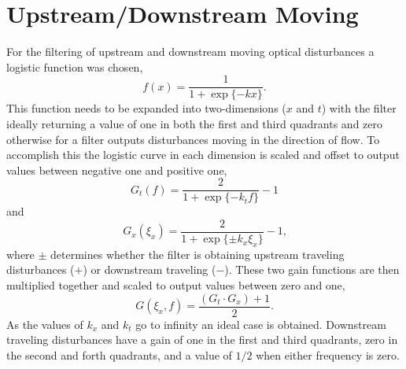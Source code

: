 \section{Upstream/Downstream Moving}
For the filtering of upstream and downstream moving optical disturbances a logistic function was chosen,
\begin{equation}
 f(x) = \frac{1}{1+\exp\{-kx\}} \textrm{.}
 \label{eqn:04_logistic}
\end{equation}
This function needs to be expanded into two-dimensions ($x$ and $t$) with the filter ideally returning a value of one in both the first and third quadrants and zero otherwise for a filter outputs disturbances moving in the direction of flow.
To accomplish this the logistic curve in each dimension is scaled and offset to output values between negative one and positive one,
\begin{equation}
 G_t(f) = \frac{2}{1+\exp\{-k_tf\}}-1
 \label{eqn:04_logistic_time}
\end{equation}
and
\begin{equation}
 G_x(\xi_x) = \frac{2}{1+\exp\{\pm k_x\xi_x\}}-1 \textrm{,}
 \label{eqn:04_logistic_space}
\end{equation}
where $\pm$ determines whether the filter is obtaining upstream traveling disturbances ($+$) or downstream traveling ($-$).
These two gain functions are then multiplied together and scaled to output values between zero and one,
\begin{equation}
 G(\xi_x,f) = \frac{(G_t\cdot G_x)+1}{2} \textrm{.}
 \label{eqn:04_up_down_filter}
\end{equation}
As the values of $k_x$ and $k_t$ go to infinity an ideal case is obtained.
Downstream traveling disturbances have a gain of one in the first and third quadrants, zero in the second and forth quadrants, and a value of $1/2$ when either frequency is zero.

